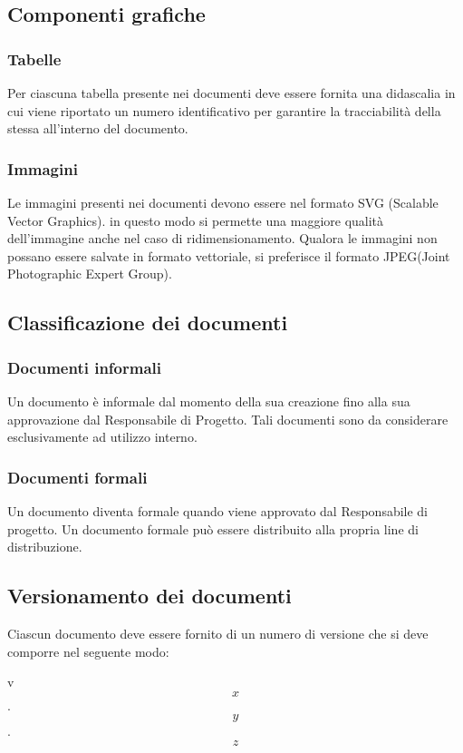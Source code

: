\subsection{Componenti grafiche}
\subsubsection{Tabelle}
Per ciascuna tabella presente nei documenti deve essere fornita una didascalia in cui viene riportato un numero identificativo per garantire la tracciabilità della stessa all'interno del documento.
\subsubsection{Immagini}
Le immagini presenti nei documenti devono essere nel formato SVG (Scalable Vector Graphics). in questo modo si permette una maggiore qualità dell'immagine anche nel caso di ridimensionamento. Qualora le immagini non possano essere salvate in formato vettoriale, si preferisce il formato JPEG(Joint Photographic Expert Group).

\subsection{Classificazione dei documenti}
\subsubsection{Documenti informali}
Un documento è informale dal momento della sua creazione fino alla sua approvazione dal Responsabile di Progetto. Tali documenti sono da considerare esclusivamente ad utilizzo interno.
\subsubsection{Documenti formali}
Un documento diventa formale quando viene approvato dal Responsabile di progetto. Un documento formale pu\`o essere distribuito alla propria line di distribuzione.

\subsection{Versionamento dei documenti}
Ciascun documento deve essere fornito di un numero di versione che si deve comporre nel seguente modo:

\begin{center}
  v \[x\].\[y\].\[z\]
\end{center}

